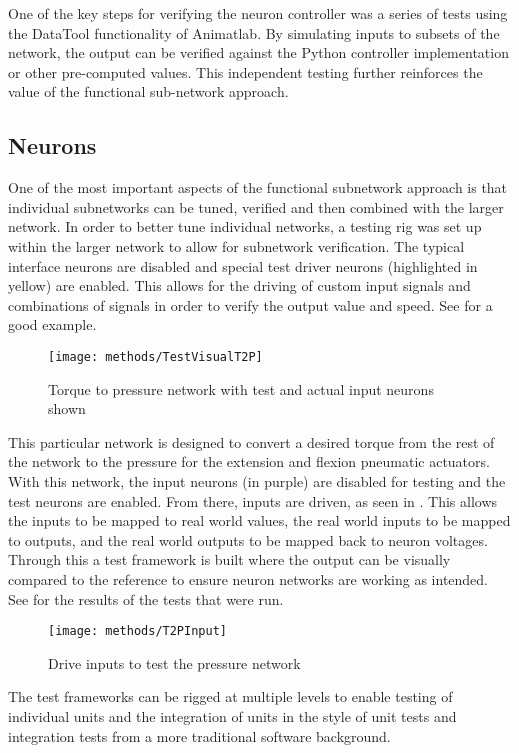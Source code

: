One of the key steps for verifying the neuron controller was a series of tests
using the DataTool functionality of Animatlab. By simulating inputs to subsets
of the network, the output can be verified against the Python controller
implementation or other pre-computed values. This independent testing further
reinforces the value of the functional sub-network approach.

\subsection{Neurons}

One of the most important aspects of the functional subnetwork approach is that
individual subnetworks can be tuned, verified and then combined with the larger
network. In order to better tune individual networks, a testing rig was set up
within the larger network to allow for subnetwork verification. The typical
interface neurons are disabled and special test driver neurons (highlighted in
yellow) are enabled. This allows for the driving of custom input signals and
combinations of signals in order to verify the output value and speed. 
See  for a good example.

\begin{figure}
\centering
\texttt{[image: methods/TestVisualT2P]}
\caption{Torque to pressure network with test and actual input neurons shown}
\label{fig:TestNetworkT2P}
\end{figure}

This particular network is designed to convert a desired torque from the rest
of the network to the pressure for the extension and flexion pneumatic actuators.
With this network, the input neurons (in purple)
are disabled for testing and the test neurons are enabled. From there, inputs
are driven, as seen in . This allows the inputs to 
be mapped to real world values, the real world inputs to be mapped to outputs, 
and the real world outputs to be mapped back to neuron voltages. Through this
a test framework is built where the output can be visually compared to the 
reference to ensure neuron networks are working as intended. See 
 for the results of the tests that were run.

\begin{figure}
\centering
\texttt{[image: methods/T2PInput]}
\caption{Drive inputs to test the pressure network}
\label{fig:TestNetworkInputs}
\end{figure}

The test frameworks can be rigged at multiple levels to enable testing of
individual units and the integration of units in the style of unit tests and
integration tests from a more traditional software background.
